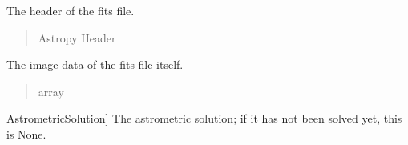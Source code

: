 \documentclass[letterpaper,11pt,english]{sphinxmanual}
\begin{document}
\begin{savenotes}
\begin{fulllineitems}
\begin{savenotes}
\begin{fulllineitems}
\begin{quote}
\begin{description}
\end{description}\end{quote}

\end{fulllineitems}\end{savenotes}


\begin{savenotes}\begin{fulllineitems}
\label{\detokenize{code/opihiexarata.opihi.solution:opihiexarata.opihi.solution.OpihiSolution.header}}
\pysigstartsignatures
{}
\pysigstopsignatures
\sphinxAtStartPar
The header of the fits file.
\begin{quote}\begin{description}
\sphinxAtStartPar
Astropy Header

\end{description}\end{quote}

\end{fulllineitems}\end{savenotes}


\begin{savenotes}\begin{fulllineitems}
\label{\detokenize{code/opihiexarata.opihi.solution:opihiexarata.opihi.solution.OpihiSolution.data}}
\pysigstartsignatures
{}
\pysigstopsignatures
\sphinxAtStartPar
The image data of the fits file itself.
\begin{quote}\begin{description}
\sphinxAtStartPar
array

\end{description}\end{quote}

\end{fulllineitems}\end{savenotes}

\begin{description}
\sphinxlineitem{astrometrics}{[}AstrometricSolution{]}
\sphinxAtStartPar
The astrometric solution; if it has not been solved yet, this is None.


\end{description}
\end{fulllineitems}
\end{savenotes}
\end{document}
